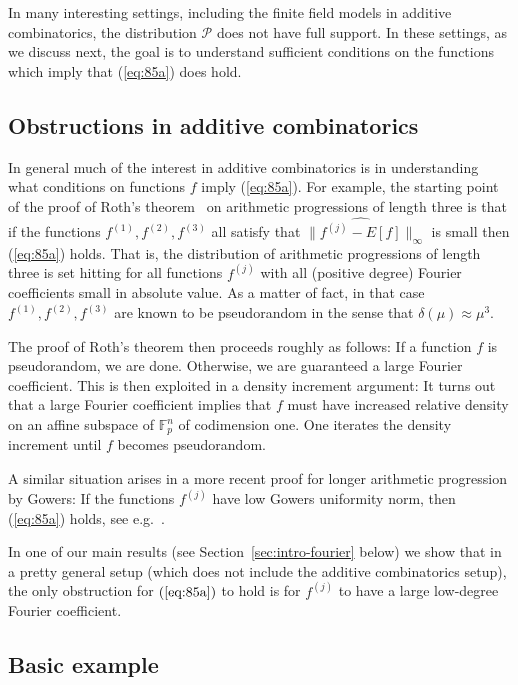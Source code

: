 \documentclass{daj}
\newcommand{\1}{\mathbbm{1}}
\theoremstyle{plain}
\theoremstyle{definition}
\begin{document}
In many interesting settings, including the finite field models in
additive combinatorics, the distribution $\mathcal{P}$ does not have full
support. In these settings, as we discuss next,
the goal is to understand sufficient conditions
on the functions which imply that (\ref{eq:85a}) does hold. 

\subsection{Obstructions in additive combinatorics} 
In general much of the interest in additive combinatorics is in understanding
what conditions on functions $f$ imply (\ref{eq:85a}).
For example, the starting point of the proof of Roth's theorem~\cite{Rot53}
on arithmetic progressions of length three is that
if the functions $f^{(1)},f^{(2)},f^{(3)}$ all satisfy that 
$\| \widehat{f^{(j)} - E[f]}  \|_{\infty}$ is small
then (\ref{eq:85a}) holds. That is, the distribution of arithmetic progressions
of length three is set hitting for all functions $f^{(j)}$ with
all (positive degree) Fourier coefficients small in absolute value.
As a matter of fact,
in that case $f^{(1)}, f^{(2)}, f^{(3)}$ are known to be pseudorandom in the sense
that $\delta(\mu) \approx \mu^3$.

The proof of Roth's theorem then proceeds roughly as follows: If a function $f$
is pseudorandom, we are done. Otherwise, we are guaranteed a large Fourier
coefficient. This is then exploited in a density increment argument:
It turns out that a large Fourier coefficient implies that $f$ must
have increased relative density on an affine subspace of $\mathbb{F}_p^n$
of codimension one.
One iterates the density increment until $f$ becomes pseudorandom.

A similar situation arises in a more recent proof
for longer arithmetic progression by Gowers:
If the functions $f^{(j)}$ have low Gowers uniformity norm, then 
 (\ref{eq:85a}) holds, see e.g.~\cite{Green05}. 
 
 In one of our main results (see Section~\ref{sec:intro-fourier} below)
 we show that in a pretty general setup (which does not include the additive
 combinatorics setup), the only obstruction for $(\ref{eq:85a})$ to hold is for
 $f^{(j)}$ to have a large low-degree Fourier coefficient. 

\subsection{Basic example}
\label{sec:basic}
\end{document}
